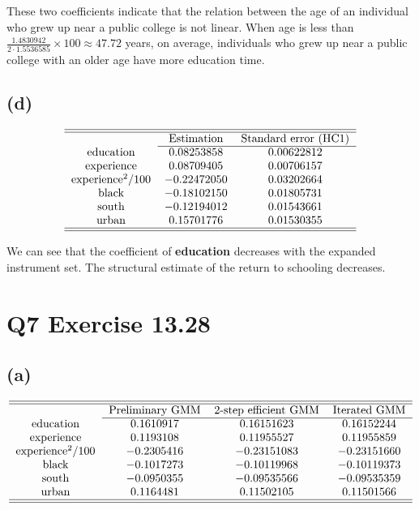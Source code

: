\documentclass{article}
\begin{document}
These two coefficients indicate that the relation between the age of an
individual who grew up near a public college is not linear. When age is less
than $\frac{1.4830942}{2\cdot 1.5536585}\times 100\approx 47.72$ years, on
average, individuals who grew up near a public college with an older age
have more education time.

\subsection*{(d)}

\begin{equation*}
\begin{tabular}{ccc}
\hline\hline
& Estimation & Standard error (HC1) \\ \cline{2-3}
education & $0.08253858$ & $0.00622812$ \\ 
experience & $0.08709405$ & $0.00706157$ \\ 
experience$^{2}/100$ & $-0.22472050$ & $0.03202664$ \\ 
black & $-0.18102150$ & $0.01805731$ \\ 
south & $-0.12194012$ & $0.01543661$ \\ 
urban & $0.15701776$ & $0.01530355$ \\ \hline\hline
\end{tabular}%
\end{equation*}

We can see that the coefficient of \textbf{education} decreases with the
expanded instrument set. The structural estimate of the return to schooling
decreases.

\section*{Q7 Exercise 13.28}

\subsection*{(a)}

\begin{equation*}
\begin{tabular}{cccc}
\hline\hline
& Preliminary GMM & 2-step efficient GMM & Iterated GMM \\ \cline{2-4}
education & $0.1610917$ & $0.16151623$ & $0.16152244$ \\ 
experience & $0.1193108$ & $0.11955527$ & $0.11955859$ \\ 
experience$^{2}/100$ & $-0.2305416$ & $-0.23151083$ & $-0.23151660$ \\ 
black & $-0.1017273$ & $-0.10119968$ & $-0.10119373$ \\ 
south & $-0.0950355$ & $-0.09535566$ & $-0.09535359$ \\ 
urban & $0.1164481$ & $0.11502105$ & $0.11501566$ \\ \hline\hline
\end{tabular}%
\end{equation*}
\end{document}
